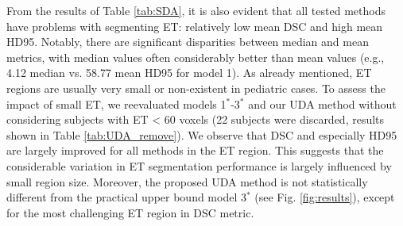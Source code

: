 \documentclass[runningheads]{llncs}
\begin{document}

From the results of Table \ref{tab:SDA}, it is also evident that all tested methods have problems with segmenting ET: relatively low mean DSC and high mean HD95. Notably, there are significant disparities between median and mean metrics, with median values often considerably better than mean values (e.g., 4.12 median vs. 58.77 mean HD95 for model 1). %
As already mentioned, ET regions are usually very small or non-existent in pediatric cases. %
To assess the impact of small ET, we reevaluated models 1$^*$-3$^*$ and our UDA method without considering subjects with ET < 60 voxels (22 subjects were discarded, results shown in Table \ref{tab:UDA_remove}). %
We observe that DSC and especially HD95 are largely improved for all methods in the ET region. This suggests that the considerable variation in ET segmentation performance is largely influenced by small region size. %
Moreover, the proposed UDA method is not statistically different from the practical upper bound model 3$^*$ (see Fig. \ref{fig:results}), except for the most challenging ET region in DSC metric. %
\end{document}
